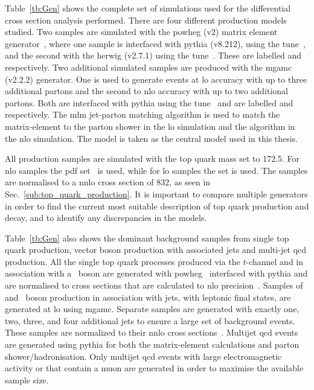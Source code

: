 Table~\ref{tb:Gen} shows the complete set of simulations used for the differential cross section analysis performed.
There are four different \ttbar{} production models studied.
Two \ttbar{} samples are simulated with the \acrshort{powheg} (v2) matrix element generator~\cite{Gen:PowHVF}, where one sample is interfaced with \acrshort{pythia} (v8.212), using the \CUET{} tune~\cite{Gen:CUETP8M2T4}, and the second with the \acrshort{herwig} (v2.7.1) using the \herwigtune{} tune~\cite{Gen:EE5C}.
These are labelled \powhegpythia{} and \powhegherwig{} respectively.
Two additional simulated \ttbar samples are produced with the \acrshort{mgamc} (v2.2.2) generator.
One is used to generate events at \acrshort{lo} accuracy with up to three additional partons and the second to \acrshort{nlo} accuracy with up to two additional partons.
Both are interfaced with \acrshort{pythia} using the \CUETold{} tune~\cite{Gen:CUETP8M1} and are labelled \mgamcLO{} and \mgamcNLO{} respectively.
The \acrshort{mlm} jet-parton matching algorithm is used to match the matrix-element to the parton shower in the \acrshort{lo} simulation and the \FxFx{} algorithm in the \acrshort{nlo} simulation.
The \powhegpythia{} model is taken as the central model used in this thesis.

All \ttbar{} production samples are simulated with the top quark mass set to 172.5\GeV{}.
For \acrshort{nlo} samples the \nnpdf{} \acrshort{pdf} set~\cite{Gen:NNPDF} is used, while for \acrshort{lo} samples the \nnpdflo{} set is used.
The samples are normalised to a \acrshort{nnlo} \ttbar{} cross section of 832\pb{}, as seen in Sec.~\ref{sub:top_quark_production}.
It is important to compare multiple \ttbar{} generators in order to find the current most suitable description of top quark production and decay, and to identify any discrepancies in the models.

Table~\ref{tb:Gen} also shows the dominant background samples from single top quark production, vector boson production with associated jets and multi-jet \acrshort{qcd} production.
All the single top quark processes produced via the $t$-channel and in association with a \Wboson{}~boson are generated with \acrshort{powheg}~\cite{Gen:Pow_tchan,Gen:Pow_tWchan} interfaced with \acrshort{pythia} and are normalised to cross sections that are calculated to \acrshort{nlo} precision~\cite{Gen:ST_XSECPred_1,Gen:ST_XSECPred_2}.  
Samples of \Wboson{}{} and \Zboson{}~boson production in association with jets, with leptonic final states, are generated at \acrshort{lo} using \acrshort{mgamc}. 
Separate samples are generated with exactly one, two, three, and four additional jets to ensure a large set of background events.
These samples are normalized to their \acrshort{nnlo} cross sections~\cite{Gen:VJets_XSECPred}.
Multijet \acrshort{qcd} events are generated using \acrshort{pythia} for both the matrix-element calculations and parton shower/hadronisation.
Only multijet \acrshort{qcd} events with large electromagnetic activity or that contain a muon are generated in order to maximise the available sample size.


